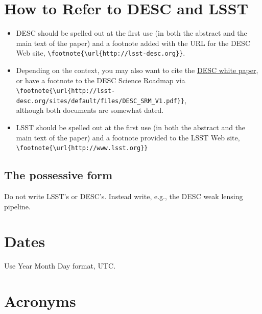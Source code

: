 \documentclass[letterpaper,11pt]{article}
\begin{document}
\section{How to Refer to DESC and LSST} 

\begin{itemize}
\item{DESC should be spelled out at the first use (in both the abstract and the main text of the paper) and a footnote added with the URL for the DESC Web site, \verb|\footnote{\url{http://lsst-desc.org}}|.}
  
\item{Depending on the context, you may also want to cite the \href{http://adsabs.harvard.edu/abs/2012arXiv1211.0310L}{DESC white paper}, or have a footnote to the DESC Science Roadmap via \\\verb|\footnote{\url{http://lsst-desc.org/sites/default/files/DESC_SRM_V1.pdf}}|, \\although both documents are somewhat dated.}

\item{LSST should be spelled out at the first use (in both the abstract and the main text of the paper) and a footnote provided to the LSST Web site, \verb|\footnote{\url{http://www.lsst.org}}|}

\end{itemize}



\subsection{The possessive form}

Do not write LSST's or DESC's.  Instead write, e.g., the DESC weak lensing pipeline.

\section{Dates}

Use Year Month Day format, UTC.


\section{Acronyms}
\end{document}
